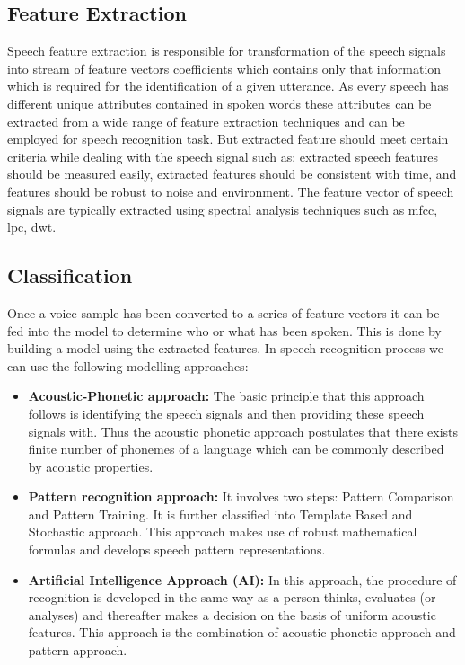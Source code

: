 \documentclass[12pt, a4paper, twoside]{report}
\begin{document}
\subsection{Feature Extraction}
Speech feature extraction is responsible for transformation of the speech signals into stream of feature vectors coefficients which contains only that information which is required for the identification of a given utterance. As every speech has different unique attributes contained in spoken words these attributes can be extracted from a wide range of feature extraction techniques and can be employed for speech recognition task. But extracted feature should meet certain criteria while dealing with the speech signal such as: extracted speech features should be measured easily, extracted features should be consistent with time, and features should be robust to noise and environment. The feature vector of speech signals are typically extracted using spectral analysis techniques such as \acrfull{mfcc}, \acrfull{lpc}, \acrfull{dwt}.
\subsection{Classification}
Once a voice sample has been converted to a series of feature vectors it can be fed into the model to determine who or what has been spoken. This is done by building a model using the extracted features. In speech recognition process we can use the following modelling approaches:
\begin{itemize}
\item {\bfseries Acoustic-Phonetic approach:} The basic principle that this approach follows is identifying the speech signals and then providing these speech signals with. Thus the acoustic phonetic approach postulates that there exists finite number of phonemes of a language which can be commonly described by acoustic properties. 
\item {\bfseries Pattern recognition approach:} It involves two steps: Pattern Comparison and Pattern Training. It is further classified into Template Based and Stochastic approach. This approach makes use of robust mathematical formulas and develops speech pattern representations.
\item {\bfseries Artificial Intelligence Approach (AI):} In this approach, the procedure of recognition is developed in the same way as a person thinks, evaluates (or analyses) and thereafter makes a decision on the basis of uniform acoustic features. This approach is the combination of acoustic phonetic approach and pattern approach.
\end{itemize}
\end{document}
